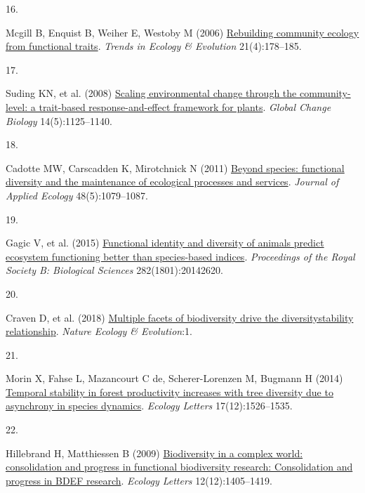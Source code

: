 \documentclass{article}
\newlength{\cslhangindent}
\newlength{\csllabelwidth}
\newlength{\cslentryspacingunit} %
\newenvironment{CSLReferences}[2] %
 {%
  \setlength{\parindent}{0pt}
  \ifodd #1
  \let\oldpar\par
  \def\par{\hangindent=\cslhangindent\oldpar}
  \fi
  \setlength{\parskip}{#2\cslentryspacingunit}
 }%
 {}
\newcommand{\CSLLeftMargin}[1]{\parbox[t]{\csllabelwidth}{#1}}
\newcommand{\CSLRightInline}[1]{\parbox[t]{\linewidth - \csllabelwidth}{#1}\break}
\begin{document}
\begin{CSLReferences}{0}{0}
\leavevmode{}%
\CSLLeftMargin{16. }%
\CSLRightInline{Mcgill B, Enquist B, Weiher E, Westoby M (2006)
\href{https://doi.org/10.1016/j.tree.2006.02.002}{Rebuilding community
ecology from functional traits}. \emph{Trends in Ecology \& Evolution}
21(4):178--185.}

\leavevmode{}%
\CSLLeftMargin{17. }%
\CSLRightInline{Suding KN, et al. (2008)
\href{https://doi.org/10.1111/j.1365-2486.2008.01557.x}{Scaling
environmental change through the community-level: a trait-based
response-and-effect framework for plants}. \emph{Global Change Biology}
14(5):1125--1140.}

\leavevmode{}%
\CSLLeftMargin{18. }%
\CSLRightInline{Cadotte MW, Carscadden K, Mirotchnick N (2011)
\href{https://doi.org/10.1111/j.1365-2664.2011.02048.x}{Beyond species:
functional diversity and the maintenance of ecological processes and
services}. \emph{Journal of Applied Ecology} 48(5):1079--1087.}

\leavevmode{}%
\CSLLeftMargin{19. }%
\CSLRightInline{Gagic V, et al. (2015)
\href{https://doi.org/10.1098/rspb.2014.2620}{Functional identity and
diversity of animals predict ecosystem functioning better than
species-based indices}. \emph{Proceedings of the Royal Society B:
Biological Sciences} 282(1801):20142620.}

\leavevmode{}%
\CSLLeftMargin{20. }%
\CSLRightInline{Craven D, et al. (2018)
\href{https://doi.org/10.1038/s41559-018-0647-7}{Multiple facets of
biodiversity drive the diversity{\textendash}stability relationship}.
\emph{Nature Ecology \& Evolution}:1.}

\leavevmode{}%
\CSLLeftMargin{21. }%
\CSLRightInline{Morin X, Fahse L, Mazancourt C de, Scherer-Lorenzen M,
Bugmann H (2014) \href{https://doi.org/10.1111/ele.12357}{Temporal
stability in forest productivity increases with tree diversity due to
asynchrony in species dynamics}. \emph{Ecology Letters}
17(12):1526--1535.}

\leavevmode{}%
\CSLLeftMargin{22. }%
\CSLRightInline{Hillebrand H, Matthiessen B (2009)
\href{https://doi.org/10.1111/j.1461-0248.2009.01388.x}{Biodiversity in
a complex world: consolidation and progress in functional biodiversity
research: Consolidation and progress in BDEF research}. \emph{Ecology
Letters} 12(12):1405--1419.}


\end{CSLReferences}
\end{document}
